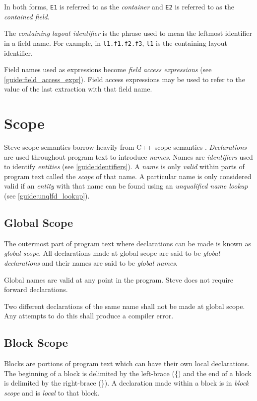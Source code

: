 In both forms, \texttt{E1} is referred to as the \textit{container} and \texttt{E2} is referred to as the \textit{contained field}.

The \textit{containing layout identifier} is the phrase used to mean the leftmost identifier in a field name. For example, in \texttt{l1.f1.f2.f3}, \texttt{l1} is the containing layout identifier.

Field names used as expressions become \textit{field access expressions} (see \ref{guide:field_access_expr}). Field access expressions may be used to refer to the value of the last extraction with that field name.

\section{Scope} \label{guide:scope}

Steve scope semantics borrow heavily from C++ scope semantics \cite{cpp_std}. \textit{Declarations} are used throughout program text to introduce \textit{names}. Names are \textit{identifiers} used to identify \textit{entities} (see \ref{guide:identifiers}). A \textit{name} is only \textit{valid} within parts of program text called the \textit{scope} of that name. A particular name is only considered valid if an \textit{entity} with that name can be found using an \textit{unqualified name lookup} (see \ref{guide:unqlfd_lookup}).

\subsection{Global Scope} \label{guide:global_scope}

The outermost part of program text where declarations can be made is known as \textit{global scope}. All declarations made at global scope are said to be \textit{global declarations} and their names are said to be \textit{global names}.

Global names are valid at any point in the program. Steve does not require forward declarations.

Two different declarations of the same name shall not be made at global scope. Any attempts to do this shall produce a compiler error.

\subsection{Block Scope} \label{guide:block_scope}

Blocks are portions of program text which can have their own local declarations. The beginning of a block is delimited by the left-brace (\{) and the end of a block is delimited by the right-brace (\}). A declaration made within a block is in \textit{block scope} and is \textit{local} to that block.

